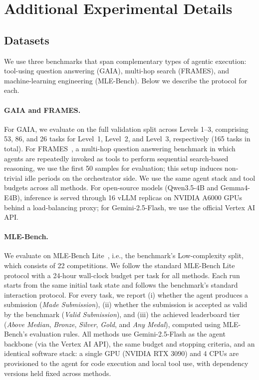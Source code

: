 \newpage
\appendix
\onecolumn
\section{Additional Experimental Details} 
\label{sec:appendix_details}

\subsection{Datasets}
\label{sec:appendix_datasets}
We use three benchmarks that span complementary types of agentic execution: tool-using question answering (GAIA), multi-hop search (FRAMES), and machine-learning engineering (MLE-Bench). Below we describe the protocol for each.

\paragraph{GAIA and FRAMES.}
For GAIA, we evaluate on the full validation split across Levels 1--3, comprising 53, 86, and 26 tasks for Level~1, Level~2, and Level~3, respectively (165 tasks in total). For FRAMES~\cite{krishna2024frames}, a multi-hop question answering benchmark in which agents are repeatedly invoked as tools to perform sequential search-based reasoning, we use the first 50 samples for evaluation; this setup induces non-trivial idle periods on the orchestrator side. We use the same agent stack and tool budgets across all methods. For open-source models (Qwen3.5-4B and Gemma4-E4B), inference is served through 16 vLLM replicas on NVIDIA A6000 GPUs behind a load-balancing proxy; for Gemini-2.5-Flash, we use the official Vertex AI API.

\paragraph{MLE-Bench.}
We evaluate on MLE-Bench Lite~\cite{chan2024mle-bench}, i.e., the benchmark's Low-complexity split, which consists of 22 competitions. We follow the standard MLE-Bench Lite protocol with a 24-hour wall-clock budget per task for all methods. Each run starts from the same initial task state and follows the benchmark's standard interaction protocol. For every task, we report (i) whether the agent produces a submission (\emph{Made Submission}), (ii) whether the submission is accepted as valid by the benchmark (\emph{Valid Submission}), and (iii) the achieved leaderboard tier (\emph{Above Median}, \emph{Bronze}, \emph{Silver}, \emph{Gold}, and \emph{Any Medal}), computed using MLE-Bench's evaluation rules. All methods use Gemini-2.5-Flash as the agent backbone (via the Vertex AI API), the same budget and stopping criteria, and an identical software stack: a single GPU (NVIDIA RTX 3090) and 4 CPUs are provisioned to the agent for code execution and local tool use, with dependency versions held fixed across methods.

